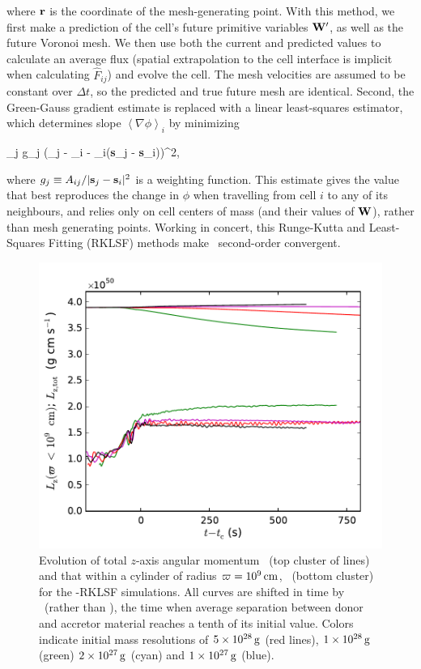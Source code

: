 \noindent where ${\bf r}$ is the coordinate of the mesh-generating point.  With this method, we first make a prediction of the cell's future primitive variables ${\bf W}^\prime$, as well as the future Voronoi mesh.  We then use both the current and predicted values to calculate an average flux (spatial extrapolation to the cell interface is implicit when calculating $\hat{F}_{ij}$) and evolve the cell.  The mesh velocities are assumed to be constant over $\Delta t$, so the predicted and true future mesh are identical.  Second, the Green-Gauss gradient estimate is replaced with a linear least-squares estimator, which determines slope $\left\langle \nabla \phi \right\rangle_i$ by minimizing

\eqbegin
\sum_j g_j \left(\phi_j - \phi_i - \left\langle \nabla \phi \right\rangle_i({\bf s}_j - {\bf s}_i)\right)^2,
\label{eq:c3_leastsq_grad}
\eqend

\noindent where $g_j \equiv A_{ij}/|{\bf s}_j - {\bf s}_i|^2$ is a weighting function.  This estimate gives the value that best reproduces the change in $\phi$ when travelling from cell $i$ to any of its neighbours, and relies only on cell centers of mass (and their values of ${\bf W}$), rather than mesh generating points.  Working in concert, this Runge-Kutta and Least-Squares Fitting (RKLSF) methods make \arepo\ second-order convergent.

\begin{figure}
\centering
\includegraphics[angle=0,width=0.6\columnwidth]{chapter3_zhu+u/figures/lz_development2.pdf}
\caption{Evolution of total $z$-axis angular momentum \Lztot\ (top cluster of lines) and that within a cylinder of radius $\varpi = 10^9\,\mathrm{cm}$, \Lzinner\ (bottom cluster) for the \arepo-RKLSF simulations.  All curves are shifted in time by \tcoal\ (rather than \tlm), the time when average separation between donor and accretor material reaches a tenth of its initial value.  Colors indicate initial mass resolutions of $5\times10^{28}\,\mathrm{g}$ (red lines), $1\times10^{28}\,\mathrm{g}$ (green) $2\times10^{27}\,\mathrm{g}$ (cyan) and $1\times10^{27}\,\mathrm{g}$ (blue).}
\label{fig:c3_fix_angmo_nar}
\end{figure}


